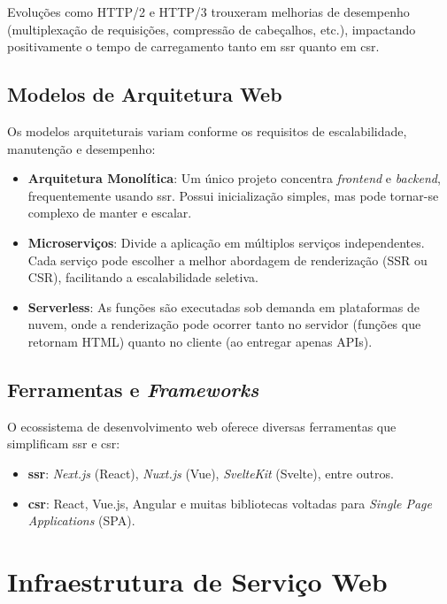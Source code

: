 Evoluções como HTTP/2 e HTTP/3 trouxeram melhorias de desempenho (multiplexação de requisições, compressão de cabeçalhos, etc.), impactando positivamente o tempo de carregamento tanto em \acrshort{ssr} quanto em \acrshort{csr}.

\subsection{Modelos de Arquitetura Web}
\label{subsec:modelos-arq-web}
Os modelos arquiteturais variam conforme os requisitos de escalabilidade, manutenção e desempenho:

\begin{itemize}
    \item \textbf{Arquitetura Monolítica}: Um único projeto concentra \textit{frontend} e \textit{backend}, frequentemente usando \acrshort{ssr}. Possui inicialização simples, mas pode tornar-se complexo de manter e escalar.
    \item \textbf{Microserviços}: Divide a aplicação em múltiplos serviços independentes. Cada serviço pode escolher a melhor abordagem de renderização (SSR ou CSR), facilitando a escalabilidade seletiva.
    \item \textbf{Serverless}: As funções são executadas sob demanda em plataformas de nuvem, onde a renderização pode ocorrer tanto no servidor (funções que retornam HTML) quanto no cliente (ao entregar apenas APIs).
\end{itemize}

\subsection{Ferramentas e \textit{Frameworks}}
\label{subsec:ferramentas-frameworks}
O ecossistema de desenvolvimento web oferece diversas ferramentas que simplificam \acrshort{ssr} e \acrshort{csr}:

\begin{itemize}
    \item \textbf{\acrshort{ssr}}: \textit{Next.js} (React), \textit{Nuxt.js} (Vue), \textit{SvelteKit} (Svelte), entre outros.
    \item \textbf{\acrshort{csr}}: React, Vue.js, Angular e muitas bibliotecas voltadas para \textit{Single Page Applications} (SPA).
\end{itemize}


\section{Infraestrutura de Serviço Web}
\label{sec:infraestrutura-web}


